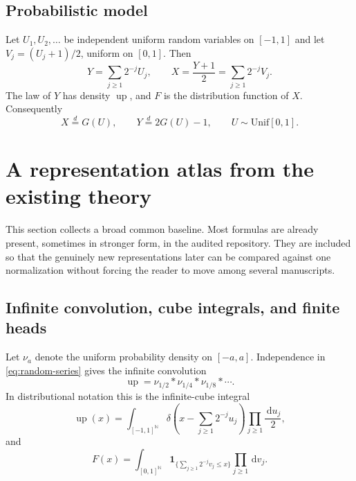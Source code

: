 \documentclass[11pt,oneside]{article}
\theoremstyle{definition}
\theoremstyle{remark}
\newcommand{\N}{\mathbb N}
\newcommand{\Up}{\operatorname{up}}
\newcommand{\dd}{\,\mathrm d}
\newcommand{\one}{\mathbf 1}
\begin{document}
\subsection{Probabilistic model}

Let $U_1,U_2,\ldots$ be independent uniform random variables on $[-1,1]$ and
let $V_j=(U_j+1)/2$, uniform on $[0,1]$.  Then
\begin{equation}\label{eq:random-series}
 Y=\sum_{j\ge1}2^{-j}U_j,\qquad
 X=\frac{Y+1}{2}=\sum_{j\ge1}2^{-j}V_j.
\end{equation}
The law of $Y$ has density $\Up$, and $F$ is the distribution function of $X$.
Consequently
\begin{equation}\label{eq:quantile-push}
 X\overset d=G(U),\qquad
 Y\overset d=2G(U)-1,
 \qquad U\sim\mathrm{Unif}[0,1].
\end{equation}

\section{A representation atlas from the existing theory}
\label{sec:atlas}

This section collects a broad common baseline.  Most formulas are already
present, sometimes in stronger form, in the audited repository.  They are
included so that the genuinely new representations later can be compared
against one normalization without forcing the reader to move among several
manuscripts.

\subsection{Infinite convolution, cube integrals, and finite heads}

Let $\nu_a$ denote the uniform probability density on $[-a,a]$.
Independence in \eqref{eq:random-series} gives the infinite convolution
\begin{equation}\label{eq:infinite-convolution}
 \Up=\nu_{1/2}*\nu_{1/4}*\nu_{1/8}*\cdots.
\end{equation}
In distributional notation this is the infinite-cube integral
\begin{equation}\label{eq:delta-cube}
 \Up(x)=\int_{[-1,1]^{\N}}
 \delta\!\left(x-\sum_{j\ge1}2^{-j}u_j\right)
 \prod_{j\ge1}\frac{\dd u_j}{2},
\end{equation}
and
\begin{equation}\label{eq:F-cube}
 F(x)=\int_{[0,1]^{\N}}
 \one_{\{\sum_{j\ge1}2^{-j}v_j\le x\}}
 \prod_{j\ge1}\dd v_j.
\end{equation}
\end{document}
